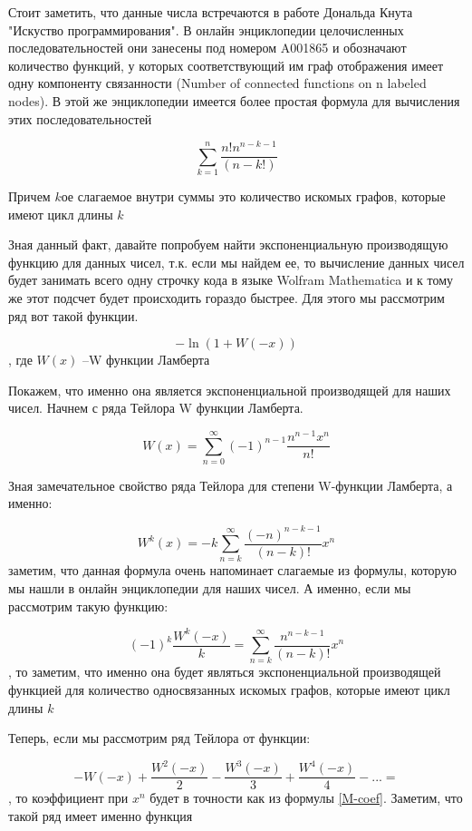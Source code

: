 \documentclass[10pt, a4paper]{report}
\begin{document}
Стоит заметить, что данные числа встречаются в работе Дональда Кнута "Искуство программирования". В онлайн энциклопедии целочисленных последовательностей они занесены под номером A001865 и обозначают количество функций, у которых соответствующий им граф отображения имеет одну компоненту связанности (Number of connected functions on n labeled nodes).
В этой же энциклопедии имеется более простая формула для вычисления этих последовательностей

\begin{equation}
	\label{M-coef}
	\sum_{k=1}^n \frac{n!n^{n-k-1}}{(n-k!)}
\end{equation}

Причем $k$ое слагаемое внутри суммы это количество искомых графов, которые имеют цикл длины $k$

Зная данный факт, давайте попробуем найти экспоненциальную производящую функцию для данных чисел, т.к. если мы найдем ее, то вычисление данных чисел будет занимать всего одну строчку кода в языке Wolfram Mathematica и к тому же этот подсчет будет происходить гораздо быстрее. Для этого мы рассмотрим ряд вот такой функции.

$$-\ln(1+W(-x))$$
, где $W(x)$ --W функции Ламберта

Покажем, что именно она является экспоненциальной производящей для наших чисел. Начнем с ряда Тейлора W функции Ламберта.

$$
W(x) = \sum_{n=0}^{\infty} (-1)^{n-1}\frac{n^{n-1}x^n}{n!}
$$ 

Зная замечательное свойство ряда Тейлора для степени W-функции Ламберта, а именно:

$$
W^k(x) = -k \sum_{n=k}^\infty \frac{(-n)^{n-k-1}}{(n-k)!}x^n
$$ 
заметим, что данная формула очень напоминает слагаемые из формулы, которую мы нашли в онлайн энциклопедии для наших чисел. А именно, если мы рассмотрим такую функцию:

\begin{equation}
\label{cycle-coef}
(-1)^{k} \frac{W^k(-x)}{k} =  \sum_{n=k}^\infty \frac{n^{n-k-1}}{(n-k)!}x^n
\end{equation} , то заметим, что именно она будет являться экспоненциальной производящей функцией для количество односвязанных искомых графов, которые имеют цикл длины $k$

Теперь, если мы рассмотрим ряд Тейлора от функции:

$$
- W(-x) + \frac{W^2(-x)}{2} - \frac{W^3(-x)}{3} + \frac{W^4(-x)}{4} - ... =
$$ , то коэффициент при $x^n$ будет в точности как из формулы \eqref{M-coef}. Заметим, что такой ряд имеет именно функция 
\end{document}
